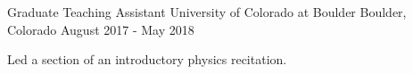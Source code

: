 \begin{cventries}
  \cventry
    {Graduate Teaching Assistant} %
    {University of Colorado at Boulder} %
    {Boulder, Colorado} %
    {August 2017 - May 2018} %
    {
      \begin{cvitems} %
        \item {Led a section of an introductory physics recitation.}
      \end{cvitems}
    }

\end{cventries}

